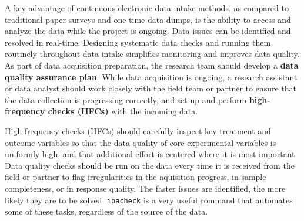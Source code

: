 \begin{fullwidth}
A key advantage of continuous electronic data intake methods,
as compared to traditional paper surveys and one-time data dumps,
is the ability to access and analyze the data while the project is ongoing.
Data issues can be identified and resolved in real-time.
Designing systematic data checks and running them routinely throughout data intake
simplifies monitoring and improves data quality.
As part of data acquisition preparation,
the research team should develop a \textbf{data quality assurance plan}.
While data acquisition is ongoing,
a research assistant or data analyst should work closely with the field team or partner
to ensure that the data collection is progressing correctly,
and set up and perform \textbf{high-frequency checks (HFCs)} with the incoming data.

High-frequency checks (HFCs) should carefully inspect key treatment and outcome variables
so that the data quality of core experimental variables is uniformly high,
and that additional effort is centered where it is most important.
Data quality checks should be run on the data every time it is received from the field or partner
to flag irregularities in the aquisition progress, in sample completeness, or in response quality.
The faster issues are identified, the more likely they are to be solved.
\texttt{ipacheck}
is a very useful command that automates some of these tasks,
regardless of the source of the data.


\end{fullwidth}
